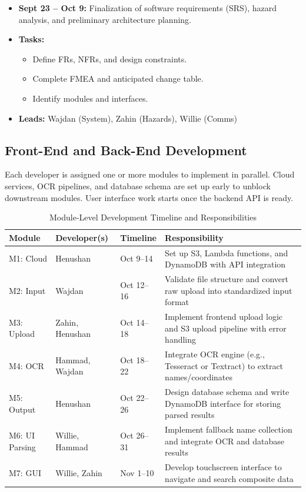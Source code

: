 \documentclass[12pt, titlepage]{article}
\begin{document}
\begin{itemize}
  \item \textbf{Sept 23 – Oct 9:} Finalization of software requirements (SRS), hazard analysis, and preliminary architecture planning.
  \item \textbf{Tasks:}
  \begin{itemize}
    \item Define FRs, NFRs, and design constraints.
    \item Complete FMEA and anticipated change table.
    \item Identify modules and interfaces.
  \end{itemize}
  \item \textbf{Leads:} Wajdan (System), Zahin (Hazards), Willie (Comms)
\end{itemize}

\subsection{Front-End and Back-End Development}
\label{SecDev}

Each developer is assigned one or more modules to implement in parallel. Cloud services, OCR pipelines, and database schema are set up early to unblock downstream modules. User interface work starts once the backend API is ready.

\begin{table}[H]
\centering
\caption{Module-Level Development Timeline and Responsibilities}
\label{tab:moduletimeline}
\begin{tabular}{|l|l|l|p{6cm}|}
\hline
\textbf{Module} & \textbf{Developer(s)} & \textbf{Timeline} & \textbf{Responsibility} \\
\hline
M1: Cloud & Henushan & Oct 9--14 & Set up S3, Lambda functions, and DynamoDB with API integration \\
\hline
M2: Input & Wajdan & Oct 12--16 & Validate file structure and convert raw upload into standardized input format \\
\hline
M3: Upload & Zahin, Henushan & Oct 14--18 & Implement frontend upload logic and S3 upload pipeline with error handling \\
\hline
M4: OCR & Hammad, Wajdan & Oct 18--22 & Integrate OCR engine (e.g., Tesseract or Textract) to extract names/coordinates \\
\hline
M5: Output & Henushan & Oct 22--26 & Design database schema and write DynamoDB interface for storing parsed results \\
\hline
M6: UI Parsing & Willie, Hammad & Oct 26--31 & Implement fallback name collection and integrate OCR and database results \\
\hline
M7: GUI & Willie, Zahin & Nov 1--10 & Develop touchscreen interface to navigate and search composite data \\
\hline
\end{tabular}
\end{table}
\end{document}
